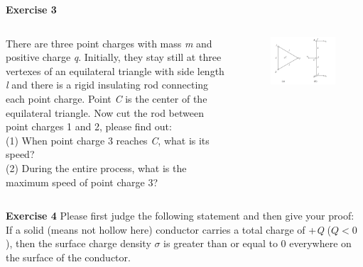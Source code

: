 \documentclass{beamer}
\begin{document}
\begin{frame}{\bf Exercise 3}
    \begin{columns}
        \begin{column}{0.6\linewidth}
        There are three point charges with mass \textit{m} and positive charge \textit{q}. Initially, they stay still 
        at three vertexes of an equilateral triangle with side length \textit{l} and there is a rigid insulating rod connecting each 
        point charge. Point \textit{C} is the center of the equilateral triangle. Now cut the rod between point charges 1 and 2, please find out:\\
        (1) When point charge 3 reaches \textit{C}, what is its speed?\\
        (2) During the entire process, what is the maximum speed of point charge 3?
        \end{column}
        \begin{column}{.4\linewidth}
            \begin{figure}[H]
                \centering
                \includegraphics[scale=0.4]{images/009.png}
                \end{figure}
        \end{column}
    \end{columns}
\end{frame}


\begin{frame}{\bf Exercise 4}
    Please first judge the following statement and then give your proof:\\
    If a solid (means not hollow here) conductor carries a total charge of +\textit{Q} ($Q<0$), 
    then the surface charge density $\sigma$ is greater than or equal to 0 everywhere on the surface of the conductor.
\end{frame}
\end{document}
